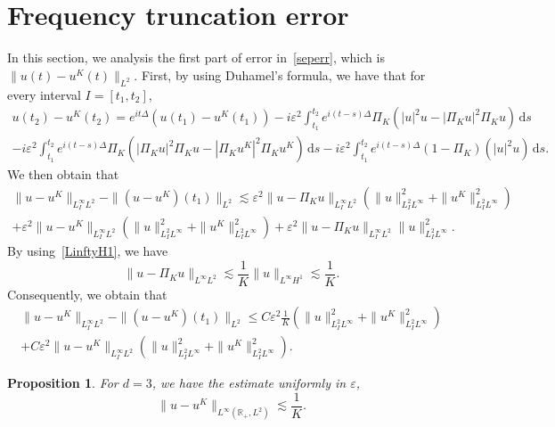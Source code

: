 \documentclass[10pt,a4paper]{article}
\newtheorem{proposition}[theorem]{Proposition}
\begin{document}
  \section{Frequency truncation error}\label{sec:freq-trunc-err}

  In this section, we analysis the first part of error in~\eqref{seperr}, which
  is \(\|u(t)-u^K(t)\|_{L^2}\). First, by using Duhamel's formula, we have
  that for every interval \(I = [t_1 , t_2]\),
  \begin{multline}
    u(t_2) - u^K(t_2) = e^{it\Delta}(u(t_1) - u^K(t_1))  
    - i \varepsilon^2 \int_{t_1}^{t_2} e^{i(t-s)\Delta} \Pi_K (|u|^2u 
    - |\Pi_K u|^2\Pi_K u) \,\mathrm{d}s \\ 
    - i \varepsilon^2 \int_{t_1}^{t_2} e^{i(t-s)\Delta} \Pi_K (|\Pi_K u|^2\Pi_K u 
    - |\Pi_K u^K|^2\Pi_K u^K) \,\mathrm{d}s  
    - i \varepsilon^2 \int_{t_1}^{t_2} e^{i(t-s)\Delta} (1 - \Pi_K)(|u|^2u) 
    \,\mathrm{d}s .
  \end{multline}
  We then obtain that
  \begin{multline}
    \|u-u^K\|_{L^{\infty}_{I}L^2} - \|(u-u^K)(t_1)\|_{L^2} \lesssim
    \varepsilon^2 \| u - \Pi_K u \|_{L^{\infty}_{I}L^2} ( \|u\|^2_{L^2_{I}L^{\infty}} + 
    \|u^K\|^2_{L^2_{I}L^{\infty}} ) \\
    + \varepsilon^2 \| u - u^K \|_{L^{\infty}_{I}L^2} ( \|u\|^2_{L^2_{I}L^{\infty}} + 
    \|u^K\|^2_{L^2_{I}L^{\infty}} ) + \varepsilon^2 \| u - \Pi_K u \|_{L^{\infty}_{I}L^2} 
    \|u\|^2_{L^2_{I}L^{\infty}}.
  \end{multline}
  By using~\eqref{LinftyH1}, we have 
  \[ \|u-\Pi_K u\|_{L^\infty L^2} \lesssim \frac1K \|u\|_{L^\infty H^1} \lesssim
  \frac1K. \]
  Consequently, we obtain that 
  \begin{multline}\label{u-uKLinftyL2}
    \|u-u^K\|_{L^\infty_I L^2} - \|(u-u^K)(t_1)\|_{L^2} \leq C
    \varepsilon^2 \frac1K (\|u\|^2_{L^2_I L^\infty} + 
    \|u^K\|^2_{L^2_I L^\infty} ) \\
    + C \varepsilon^2 \| u - u^K \|_{L^\infty_I L^2} ( \|u\|^2_{L^2_I L^\infty} + 
    \|u^K\|^2_{L^2_I L^\infty} ).
  \end{multline}


  \begin{proposition}\label{u-uKLinftyL2d3}
    For \(d=3\), we have the estimate uniformly in \(\varepsilon\),
    \begin{equation}
      \|u-u^K\|_{L^\infty({\mathbb R_+},L^2)} \lesssim \frac1K.
    \end{equation}
  \end{proposition}
\end{document}
